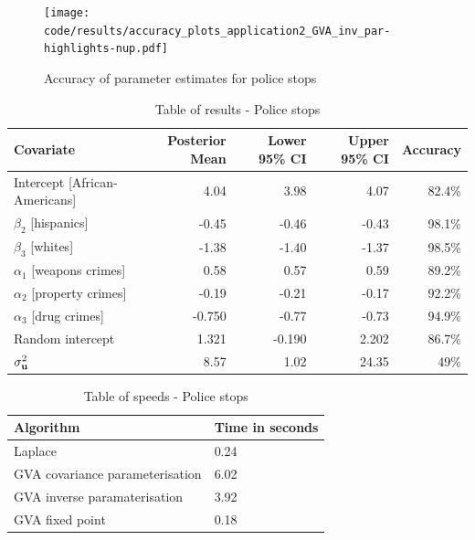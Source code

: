 			\begin{figure}
			\texttt{[image: code/results/accuracy\_plots\_application2\_GVA\_inv\_par-highlights-nup.pdf]}
			\caption{Accuracy of parameter estimates for police stops}
			\label{fig:police_stops}
			\end{figure}

			\begin{table}
				\caption{Table of results - Police stops}
				\label{tab:application_police_stops}
				\begin{tabular}{|l|rrrr|}
					\hline
					Covariate                     & Posterior Mean & Lower 95\% CI & Upper 95\% CI & Accuracy \\
					\hline
					Intercept [African-Americans] & 4.04          & 3.98           & 4.07          & 82.4\%   \\
					$\beta_2$ [hispanics]         & -0.45         & -0.46          & -0.43         & 98.1\%   \\
					$\beta_3$ [whites]            & -1.38         & -1.40          & -1.37         & 98.5\%   \\
					$\alpha_1$ [weapons crimes]   & 0.58          & 0.57           & 0.59          & 89.2\%   \\
					$\alpha_2$ [property crimes]  & -0.19         & -0.21          & -0.17         & 92.2\%   \\
					$\alpha_3$ [drug crimes]      & -0.750        & -0.77          & -0.73         & 94.9\%   \\
					Random intercept              & 1.321         & -0.190         & 2.202         & 86.7\%   \\
					$\sigma^2_{{\bf u}}$              & 8.57          & 1.02           & 24.35         & 49\%     \\
					\hline
				\end{tabular}
			\end{table}
			
			\begin{table}
				\begin{tabular}{|ll|}
					\hline
					Algorithm & Time  in seconds \\
					\hline
					Laplace & 0.24 \\
					GVA covariance parameterisation & 6.02 \\
					GVA inverse paramaterisation & 3.92 \\
					GVA fixed point & 0.18 \\
					\hline
				\end{tabular}
				\caption{Table of speeds - Police stops}
				\label{tab:police_stop_speeds}
			\end{table}
			
